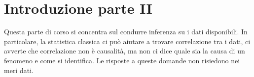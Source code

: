 \chapter{Introduzione parte II}
Questa parte di corso si concentra sul condurre inferenza su i dati disponibili.
In particolare, la statistica classica ci può aiutare a trovare correlazione tra i dati,
ci avverte che correlazione non è causalità, ma non ci dice quale 
sia la causa di un fenomeno e come si identifica.
Le risposte a queste domande non risiedono nei meri dati.

